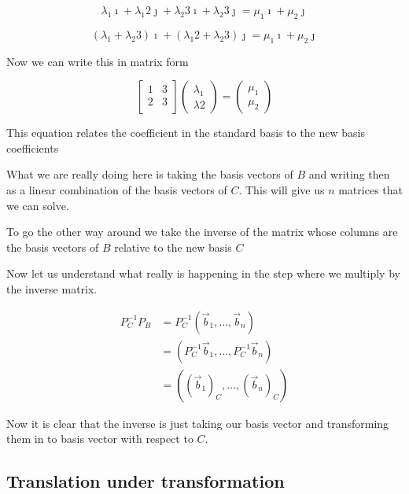 \[
    \lambda_1 \imath + \lambda_1 2 \jmath + \lambda_2 3 \imath + \lambda_2 3 \jmath = \mu_1 \imath + \mu_2 \jmath 
\]

\[
    (\lambda_1  +  \lambda_2 3)\imath + (\lambda_1 2  + \lambda_2 3) \jmath = \mu_1 \imath + \mu_2 \jmath 
\]

Now we can write this in matrix form

\[
    \begin{bmatrix}
        1 & 3 \\
        2 & 3 \\
    \end{bmatrix} \begin{pmatrix}
        \lambda_1 \\ \lambda2
    \end{pmatrix} = \begin{pmatrix}
        \mu_1 \\ \mu_2
    \end{pmatrix}
\]

This equation relates the coefficient in the standard basis to the new basis
coefficients
\vspace{\baselineskip}

What we are really doing here is taking the basis vectors of \(B\) and writing then as a linear combination
of the basis vectors of \(C\). This will give us \(n\) matrices that we can solve.
\vspace{\baselineskip}

To go the other way around we take the inverse of the matrix whose columns are the basis vectors of \(B\)
relative to the new basis \(C\)
\vspace{\baselineskip}

Now let us understand what really is happening in the step where we multiply by the inverse matrix.

\begin{align*}
    P_{C}^{-1} P_B &= P_{C}^{-1}(\vec{b}_1, \dots, \vec{b}_n) \\
    &= (P_{C}^{-1}\vec{b}_1, \dots, P_{C}^{-1}\vec{b}_n)\\
    &= ({(\vec{b}_1)}_C, \dots, {(\vec{b}_n)}_C)
\end{align*}

Now it is clear that the inverse is just taking our basis vector and transforming
them in to basis vector with respect to \(C\).

\subsection{Translation under transformation}

